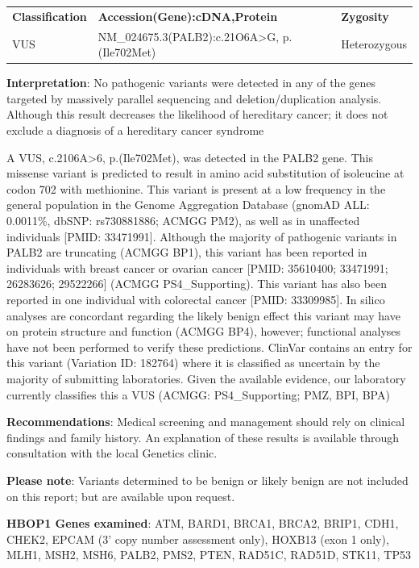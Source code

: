 \documentclass[10pt,letterpaper]{extarticle}
\begin{document}
\begin{tabular}{ l l l }
\bf Classification & \bf Accession(Gene):cDNA,Protein & \bf Zygosity\\
VUS & NM\_024675.3(PALB2):c.21O6A>G, p.(Ile702Met) & Heterozygous\\
\end{tabular}

{\bf Interpretation}: No pathogenic variants were detected in any of the genes targeted by massively parallel sequencing and deletion/duplication analysis. Although this result decreases the likelihood of hereditary cancer; it does not exclude a diagnosis of a hereditary cancer syndrome

A VUS, c.2106A>6, p.(Ile702Met), was detected in the PALB2 gene. This missense variant is predicted to result in amino acid substitution of isoleucine at codon 702 with methionine. This variant is present at a low frequency in the general population in the Genome Aggregation Database (gnomAD ALL: 0.0011\%, dbSNP: rs730881886; ACMGG PM2), as well as in unaffected individuals [PMID: 33471991]. Although the majority of pathogenic variants in PALB2 are truncating (ACMGG BP1), this variant has been reported in individuals with breast cancer or ovarian cancer [PMID: 35610400; 33471991; 26283626; 29522266] (ACMGG PS4\_Supporting). This variant has also been reported in one individual with colorectal cancer [PMID: 33309985]. In silico analyses are concordant regarding the likely benign effect this variant may have on protein structure and function (ACMGG BP4), however; functional analyses have not been performed to verify these predictions. ClinVar contains an entry for this variant (Variation ID: 182764) where it is classified as uncertain by the majority of submitting laboratories. Given the available evidence, our laboratory currently classifies this a VUS (ACMGG: PS4\_Supporting; PMZ, BPI, BPA) 

{\bf Recommendations}: Medical screening and management should rely on clinical findings and family history. An explanation of these results is available through consultation with the local Genetics clinic.

{\bf Please note}: Variants determined to be benign or likely benign are not included on this report; but are available upon request.

{\bf HBOP1 Genes examined}: ATM, BARD1, BRCA1, BRCA2, BRIP1, CDH1, CHEK2, EPCAM (3' copy number assessment only), HOXB13 (exon 1 only), MLH1, MSH2, MSH6, PALB2, PMS2, PTEN, RAD51C, RAD51D, STK11, TP53 
\end{document}
